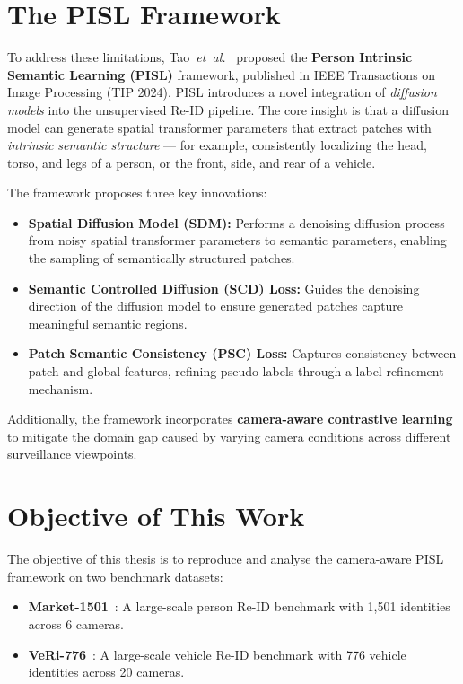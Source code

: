 \section{The PISL Framework}

To address these limitations, Tao~\textit{et~al.}~\cite{tao2024unsupervised} proposed the \textbf{Person Intrinsic Semantic Learning (PISL)} framework, published in IEEE Transactions on Image Processing (TIP 2024). PISL introduces a novel integration of \textit{diffusion models} into the unsupervised Re-ID pipeline. The core insight is that a diffusion model can generate spatial transformer parameters that extract patches with \textit{intrinsic semantic structure} --- for example, consistently localizing the head, torso, and legs of a person, or the front, side, and rear of a vehicle.

The framework proposes three key innovations:
\begin{itemize}
    \item \textbf{Spatial Diffusion Model (SDM):} Performs a denoising diffusion process from noisy spatial transformer parameters to semantic parameters, enabling the sampling of semantically structured patches.
    \item \textbf{Semantic Controlled Diffusion (SCD) Loss:} Guides the denoising direction of the diffusion model to ensure generated patches capture meaningful semantic regions.
    \item \textbf{Patch Semantic Consistency (PSC) Loss:} Captures consistency between patch and global features, refining pseudo labels through a label refinement mechanism.
\end{itemize}

Additionally, the framework incorporates \textbf{camera-aware contrastive learning}~\cite{wang2021cap} to mitigate the domain gap caused by varying camera conditions across different surveillance viewpoints.

\section{Objective of This Work}

The objective of this thesis is to reproduce and analyse the camera-aware PISL framework on two benchmark datasets:
\begin{itemize}
    \item \textbf{Market-1501}~\cite{zheng2015scalable}: A large-scale person Re-ID benchmark with 1,501 identities across 6 cameras.
    \item \textbf{VeRi-776}~\cite{liu2016deepveri}: A large-scale vehicle Re-ID benchmark with 776 vehicle identities across 20 cameras.
\end{itemize}

